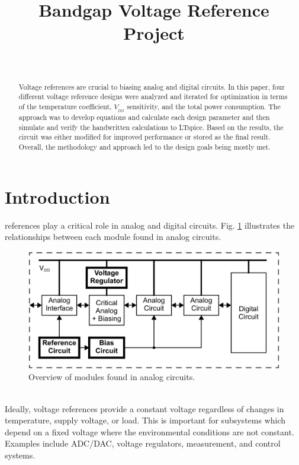 \documentclass[conference]{IEEEtran}
\begin{document}
%
\title{Bandgap Voltage Reference Project}

\author{
\\
\and
{}
\and
{}
}

\maketitle

\begin{abstract}
Voltage references are crucial to biasing analog and digital circuits.  In this paper, four different voltage reference designs were analyzed and iterated for optimization in terms of the temperature coefficient, $V_{_{DD}}$ sensitivity, and the total power consumption.  The approach was to develop equations and calculate each design parameter and then simulate and verify the handwritten calculations to LTspice.  Based on the results, the circuit was either modified for improved performance or stored as the final result.  Overall, the methodology and approach led to the design goals being mostly met.
\end{abstract}
\IEEEpeerreviewmaketitle

\section{Introduction}
 references play a critical role in analog and digital circuits.  Fig. \ref{fig:overview} illustrates the relationships between each module found in analog circuits.
\begin{figure}[!htbp]
  \centering
  \includegraphics[scale=0.25]{images/overview.png}
  \caption[Overview]{Overview of modules found in analog circuits.\footnotemark}
  \label{fig:overview}
\end{figure}
\\Ideally, voltage references provide a constant voltage regardless of changes in temperature, supply voltage, or load.  This is important for subsystems which depend on a fixed voltage where the environmental conditions are not constant.  Examples include ADC/DAC, voltage regulators, measurement, and control systems.
\end{document}
